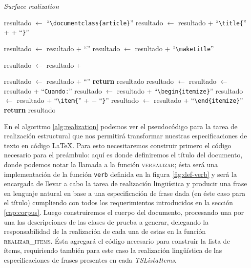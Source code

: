 \begin{algorithm}
  \caption{\textit{Surface realization}}\label{alg:realization}
  \begin{algorithmic}[1]
  
  \State resultado $\gets$ ``\verb|\documentclass{article}|''
  \State resultado $\gets$ resultado + ``\verb|\title{|'' +  + ``\verb|}|''
  
  \State resultado $\gets$ resultado + ``\verb||''
  \State resultado $\gets$ resultado + ``\verb|\maketitle|''
  
    \State resultado $\gets$ resultado +   
  \EndFor

  \State resultado $\gets$ resultado + ``\verb||''
  \State \textbf{return} resultado
  \EndFunction
  \Statex
    \State resultado $\gets$  
	\State resultado $\gets$ resultado + ``\verb|Cuando:|''
    \State resultado $\gets$ resultado + ``\verb|\begin{itemize}|''
      \State resultado $\gets$ resultado + ``\verb|\item{|'' +  + ``\verb|}|'' 
    \EndFor  
    \State resultado $\gets$ resultado + ``\verb|\end{itemize}|''
    \State \textbf{return} resultado
  \EndFunction
\end{algorithmic}
\end{algorithm}

En el algoritmo \ref{alg:realization} podemos ver el pseudocódigo para la tarea de realización estructural que nos permitirá transformar nuestras especificaciones de texto en código \LaTeX. Para esto necesitaremos construir primero el código necesario para el preámbulo: aquí es donde definiremos el título del documento, donde podemos notar la llamada a la función \textsc{verbalizar}; ésta será una implementación de la función \texttt{verb} definida en la figura \ref{fig:def-verb} y será la encargada de llevar a cabo la tarea de realización lingüística y producir una frase en lenguaje natural en base a una especificación de frase dada (en éste caso para el título) cumpliendo con todos los requerimientos introducidos en la sección \ref{cap:corpus}. Luego construiremos el cuerpo del documento, procesando una por una las descripciones de las clases de prueba a generar, delegando la responsabilidad de la realización de cada una de estas en la función \textsc{realizar\_items}. Ésta agregará el código necesario para construir la lista de ítems, requiriendo también para este caso la realización lingüística de las especificaciones de frases presentes en cada \emph{TSListaItems}.


